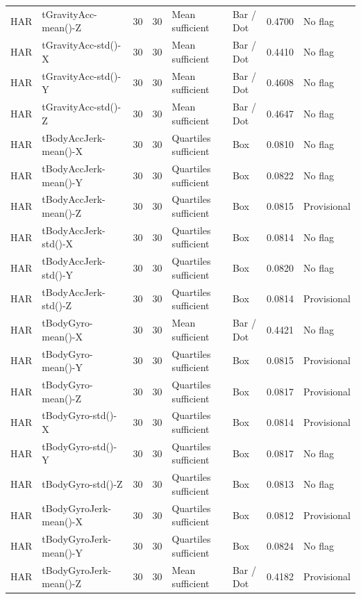 \begin{longtable}{>{\raggedright\arraybackslash}p{2.5cm}>{\raggedright\arraybackslash}p{4.5cm}rr>{\raggedright\arraybackslash}p{3.0cm}>{\raggedright\arraybackslash}p{4.0cm}rp{2.0cm}}
HAR\cite{har} & tGravityAcc-mean()-Z & 30 & 30 & Mean sufficient & Bar / Dot & 0.4700 & No flag\\
HAR\cite{har} & tGravityAcc-std()-X & 30 & 30 & Mean sufficient & Bar / Dot & 0.4410 & No flag\\
HAR\cite{har} & tGravityAcc-std()-Y & 30 & 30 & Mean sufficient & Bar / Dot & 0.4608 & No flag\\
HAR\cite{har} & tGravityAcc-std()-Z & 30 & 30 & Mean sufficient & Bar / Dot & 0.4647 & No flag\\
HAR\cite{har} & tBodyAccJerk-mean()-X & 30 & 30 & Quartiles sufficient & Box & 0.0810 & No flag\\
HAR\cite{har} & tBodyAccJerk-mean()-Y & 30 & 30 & Quartiles sufficient & Box & 0.0822 & No flag\\
HAR\cite{har} & tBodyAccJerk-mean()-Z & 30 & 30 & Quartiles sufficient & Box & 0.0815 & Provisional\\
HAR\cite{har} & tBodyAccJerk-std()-X & 30 & 30 & Quartiles sufficient & Box & 0.0814 & No flag\\
HAR\cite{har} & tBodyAccJerk-std()-Y & 30 & 30 & Quartiles sufficient & Box & 0.0820 & No flag\\
HAR\cite{har} & tBodyAccJerk-std()-Z & 30 & 30 & Quartiles sufficient & Box & 0.0814 & Provisional\\
HAR\cite{har} & tBodyGyro-mean()-X & 30 & 30 & Mean sufficient & Bar / Dot & 0.4421 & No flag\\
HAR\cite{har} & tBodyGyro-mean()-Y & 30 & 30 & Quartiles sufficient & Box & 0.0815 & Provisional\\
HAR\cite{har} & tBodyGyro-mean()-Z & 30 & 30 & Quartiles sufficient & Box & 0.0817 & Provisional\\
HAR\cite{har} & tBodyGyro-std()-X & 30 & 30 & Quartiles sufficient & Box & 0.0814 & Provisional\\
HAR\cite{har} & tBodyGyro-std()-Y & 30 & 30 & Quartiles sufficient & Box & 0.0817 & No flag\\
HAR\cite{har} & tBodyGyro-std()-Z & 30 & 30 & Quartiles sufficient & Box & 0.0813 & No flag\\
HAR\cite{har} & tBodyGyroJerk-mean()-X & 30 & 30 & Quartiles sufficient & Box & 0.0812 & Provisional\\
HAR\cite{har} & tBodyGyroJerk-mean()-Y & 30 & 30 & Quartiles sufficient & Box & 0.0824 & No flag\\
HAR\cite{har} & tBodyGyroJerk-mean()-Z & 30 & 30 & Mean sufficient & Bar / Dot & 0.4182 & Provisional\\

\end{longtable}
